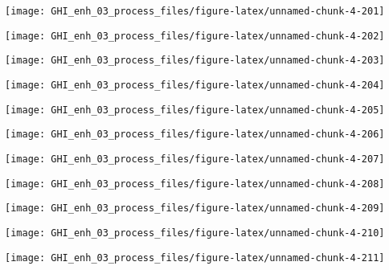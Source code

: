 \documentclass[
  10pt,
  a4paper,oneside]{article}
\begin{document}
\begin{center}\texttt{[image: GHI\_enh\_03\_process\_files/figure-latex/unnamed-chunk-4-201]} \end{center}

\begin{center}\texttt{[image: GHI\_enh\_03\_process\_files/figure-latex/unnamed-chunk-4-202]} \end{center}

\begin{center}\texttt{[image: GHI\_enh\_03\_process\_files/figure-latex/unnamed-chunk-4-203]} \end{center}

\begin{center}\texttt{[image: GHI\_enh\_03\_process\_files/figure-latex/unnamed-chunk-4-204]} \end{center}

\begin{center}\texttt{[image: GHI\_enh\_03\_process\_files/figure-latex/unnamed-chunk-4-205]} \end{center}

\begin{center}\texttt{[image: GHI\_enh\_03\_process\_files/figure-latex/unnamed-chunk-4-206]} \end{center}

\begin{center}\texttt{[image: GHI\_enh\_03\_process\_files/figure-latex/unnamed-chunk-4-207]} \end{center}

\begin{center}\texttt{[image: GHI\_enh\_03\_process\_files/figure-latex/unnamed-chunk-4-208]} \end{center}

\begin{center}\texttt{[image: GHI\_enh\_03\_process\_files/figure-latex/unnamed-chunk-4-209]} \end{center}

\begin{center}\texttt{[image: GHI\_enh\_03\_process\_files/figure-latex/unnamed-chunk-4-210]} \end{center}

\begin{center}\texttt{[image: GHI\_enh\_03\_process\_files/figure-latex/unnamed-chunk-4-211]} \end{center}
\end{document}
